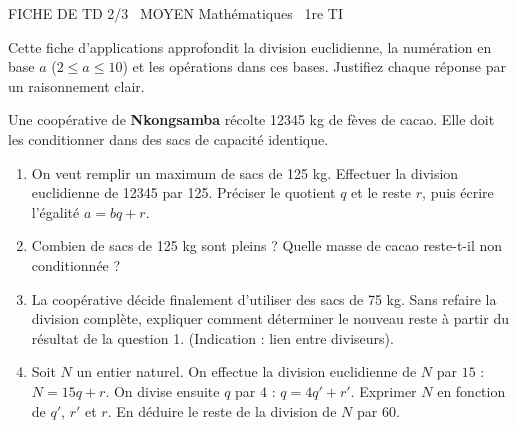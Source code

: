 \documentclass[11pt]{article}
\begin{document}
\begin{tcolorbox}[enhanced,colback=popink,colframe=popink,arc=10pt,boxrule=0pt,left=12pt,right=12pt,top=9pt,bottom=9pt]
{\color{white}\popxbold\small FICHE DE TD 2/3 \textbullet\ MOYEN \hfill Mathématiques \textbullet\ 1re TI\par}
\end{tcolorbox}
\vspace{4pt}
Cette fiche d'applications approfondit la division euclidienne, la numération en base $a$ ($2 \le a \le 10$) et les opérations dans ces bases. Justifiez chaque réponse par un raisonnement clair.

\begin{exercice}
Une coopérative de \textbf{Nkongsamba} récolte \num{12345} kg de fèves de cacao. Elle doit les conditionner dans des sacs de capacité identique.
\begin{enumerate}
    \item On veut remplir un maximum de sacs de \num{125} kg. Effectuer la division euclidienne de \num{12345} par \num{125}. Préciser le quotient $q$ et le reste $r$, puis écrire l'égalité $a = bq + r$.
    \item Combien de sacs de \num{125} kg sont pleins ? Quelle masse de cacao reste-t-il non conditionnée ?
    \item La coopérative décide finalement d'utiliser des sacs de \num{75} kg. Sans refaire la division complète, expliquer comment déterminer le nouveau reste à partir du résultat de la question 1. (Indication : lien entre diviseurs).
    \item Soit $N$ un entier naturel. On effectue la division euclidienne de $N$ par $15$ : $N = 15q + r$. On divise ensuite $q$ par $4$ : $q = 4q' + r'$. Exprimer $N$ en fonction de $q'$, $r'$ et $r$. En déduire le reste de la division de $N$ par $60$.
\end{enumerate}
\end{exercice}
\end{document}

